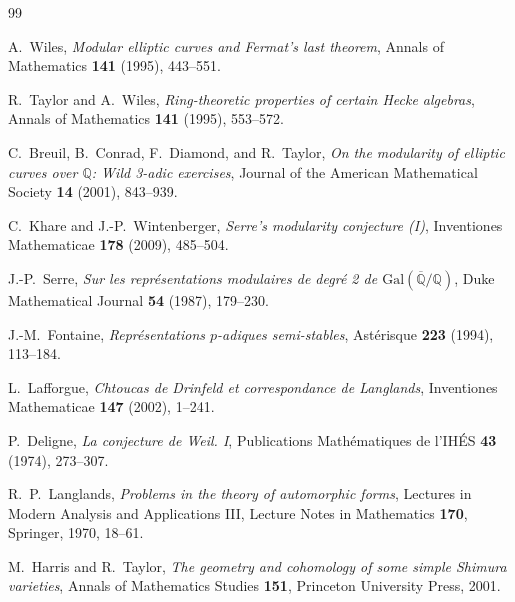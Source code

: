 \documentclass[a4paper,12pt]{amsart}
\theoremstyle{definition}
\theoremstyle{remark}
\begin{document}
\begin{thebibliography}{99}

A.~Wiles,
\textit{Modular elliptic curves and Fermat's last theorem},
Annals of Mathematics \textbf{141} (1995), 443--551.

R.~Taylor and A.~Wiles,
\textit{Ring-theoretic properties of certain Hecke algebras},
Annals of Mathematics \textbf{141} (1995), 553--572.

C.~Breuil, B.~Conrad, F.~Diamond, and R.~Taylor,
\textit{On the modularity of elliptic curves over $\mathbb{Q}$: Wild 3-adic exercises},
Journal of the American Mathematical Society \textbf{14} (2001), 843--939.

C.~Khare and J.-P.~Wintenberger,
\textit{Serre's modularity conjecture (I)},
Inventiones Mathematicae \textbf{178} (2009), 485--504.

J.-P.~Serre,
\textit{Sur les représentations modulaires de degré 2 de $\mathrm{Gal}(\overline{\mathbb{Q}}/\mathbb{Q})$},
Duke Mathematical Journal \textbf{54} (1987), 179--230.

J.-M.~Fontaine,
\textit{Représentations $p$-adiques semi-stables},
Astérisque \textbf{223} (1994), 113--184.

L.~Lafforgue,
\textit{Chtoucas de Drinfeld et correspondance de Langlands},
Inventiones Mathematicae \textbf{147} (2002), 1--241.

P.~Deligne,
\textit{La conjecture de Weil. I},
Publications Mathématiques de l'IHÉS \textbf{43} (1974), 273--307.

R.~P.~Langlands,
\textit{Problems in the theory of automorphic forms},
Lectures in Modern Analysis and Applications III,
Lecture Notes in Mathematics \textbf{170}, Springer, 1970, 18--61.

M.~Harris and R.~Taylor,
\textit{The geometry and cohomology of some simple Shimura varieties},
Annals of Mathematics Studies \textbf{151}, Princeton University Press, 2001.

\end{thebibliography}
\end{document}
